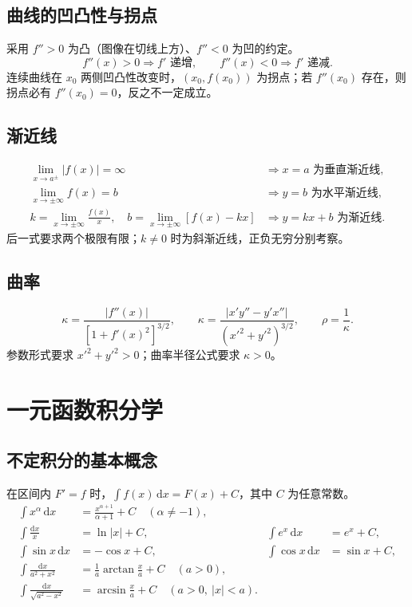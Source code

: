 \documentclass[../main.tex]{subfiles}
\begin{document}
\subsection{曲线的凹凸性与拐点}
采用 $f''>0$ 为凸（图像在切线上方）、$f''<0$ 为凹的约定。
\[
f''(x)>0\Longrightarrow f'\text{ 递增},\qquad
f''(x)<0\Longrightarrow f'\text{ 递减}.
\]
连续曲线在 $x_0$ 两侧凹凸性改变时，$(x_0,f(x_0))$ 为拐点；若 $f''(x_0)$ 存在，则拐点必有 $f''(x_0)=0$，反之不一定成立。
\subsection{渐近线}
\begin{align*}
\lim_{x\to a^\pm}|f(x)|=\infty&\Longrightarrow x=a\text{ 为垂直渐近线},\\
\lim_{x\to\pm\infty}f(x)=b&\Longrightarrow y=b\text{ 为水平渐近线},\\
k=\lim_{x\to\pm\infty}\frac{f(x)}x,\quad
b=\lim_{x\to\pm\infty}[f(x)-kx]&\Longrightarrow y=kx+b\text{ 为渐近线}.
\end{align*}
后一式要求两个极限有限；$k\ne0$ 时为斜渐近线，正负无穷分别考察。
\subsection{曲率}
\[
\kappa=\frac{|f''(x)|}{[1+f'(x)^2]^{3/2}},\qquad
\kappa=\frac{|x'y''-y'x''|}{(x'^2+y'^2)^{3/2}},\qquad \rho=\frac1\kappa.
\]
参数形式要求 $x'^2+y'^2>0$；曲率半径公式要求 $\kappa>0$。
\section{一元函数积分学}
\subsection{不定积分的基本概念}
在区间内 $F'=f$ 时，$\int f(x)\,\mathrm dx=F(x)+C$，其中 $C$ 为任意常数。
\begin{align*}
\int x^\alpha\,\mathrm dx&=\frac{x^{\alpha+1}}{\alpha+1}+C\quad(\alpha\ne-1),\\
\int\frac{\mathrm dx}{x}&=\ln|x|+C, & \int e^x\,\mathrm dx&=e^x+C,\\
\int\sin x\,\mathrm dx&=-\cos x+C, & \int\cos x\,\mathrm dx&=\sin x+C,\\
\int\frac{\mathrm dx}{a^2+x^2}&=\frac1a\arctan\frac xa+C\quad(a>0),\\
\int\frac{\mathrm dx}{\sqrt{a^2-x^2}}&=\arcsin\frac xa+C\quad(a>0,\ |x|<a).
\end{align*}
\end{document}
